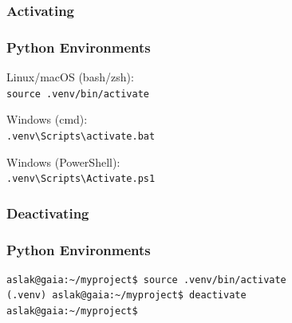 {\subsubsection{Activating}
\begin{frame}[fragile]
  \frametitle{Python Environments  }
  \vspace{3mm}
  Linux/macOS (bash/zsh): \\
  \texttt{source .venv/bin/activate}
  
  \vspace{5mm}
  Windows (cmd): \\
  \texttt{.venv\textbackslash Scripts\textbackslash activate.bat}
  
  \vspace{5mm}
  Windows (PowerShell): \\
  \texttt{.venv\textbackslash Scripts\textbackslash Activate.ps1}
\end{frame}



\subsubsection{Deactivating}
\begin{frame}[fragile]
  \frametitle{Python Environments  }
  \vspace{3mm}
  \begin{verbatim}
aslak@gaia:~/myproject$ source .venv/bin/activate
(.venv) aslak@gaia:~/myproject$ deactivate
aslak@gaia:~/myproject$
  \end{verbatim}
\end{frame}

%  

}
